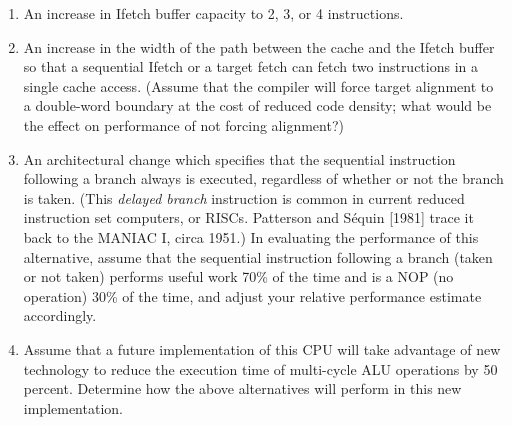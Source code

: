 \begin{enumerate}
\renewcommand{\labelenumi}{(\alph{enumi})}
\item An increase in Ifetch buffer capacity to 2, 3, or 4 instructions.
\item An increase in the width of the path between the cache and the Ifetch
buffer so that a sequential Ifetch or a target fetch can fetch two instructions
in a single cache access. (Assume that the compiler will force target alignment
to a double-word boundary at the cost of reduced code density; what
would be the effect on performance of not forcing alignment?)
\item An architectural change which specifies that the sequential instruction
following a branch always is executed, regardless of whether or not the
branch is taken. (This \emph{delayed branch} instruction is common in current reduced
instruction set computers, or RISCs. Patterson and S\'equin [1981] trace it
back to the MANIAC I, circa 1951.) In evaluating the performance of this
alternative, assume that the sequential instruction following a branch
(taken or not taken) performs useful work 70\% of the time and is a NOP (no
operation) 30\% of the time, and adjust your relative performance estimate
accordingly.
\item Assume that a future implementation of this CPU will take advantage
of new technology to reduce the execution time of multi-cycle ALU operations
by 50 percent. Determine how the above alternatives will perform in this
new implementation.
\end{enumerate}
